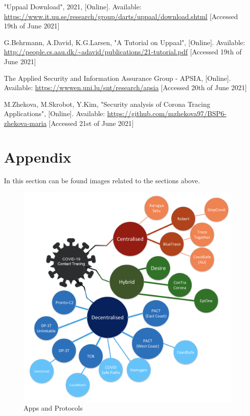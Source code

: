 \documentclass[a4paper, twocolumn]{article}
\begin{document}
\begin{thebibliography}{9}
"Uppaal Download", 2021, [Online]. Available: \url{https://www.it.uu.se/research/group/darts/uppaal/download.shtml} [Accessed 19th of June 2021]

G.Behrmann, A.David, K.G.Larsen, "A Tutorial on Uppaal", [Online]. Available: \url{http://people.cs.aau.dk/~adavid/publications/21-tutorial.pdf} [Accessed 19th of June 2021]

The Applied Security and Information Assurance Group - APSIA, [Online]. Available: \url{https://wwwen.uni.lu/snt/research/apsia} [Accessed 20th of June 2021]

M.Zhekova, M.Skrobot, Y.Kim, "Security analysis of Corona Tracing Applications", [Online]. Available:  \url{https://github.com/mzhekova97/BSP6-zhekova-maria} [Accessed 21st of June 2021]

\end{thebibliography}
\newpage
\section{Appendix} \label{appendix}
In this section can be found images related to the sections above.

\begin{figure}[h]
    \centering
    \includegraphics[scale=0.425]{images/protocolsApps.png}
    \caption{Apps and Protocols}
    \label{fig:setProt}
\end{figure}
\end{document}
